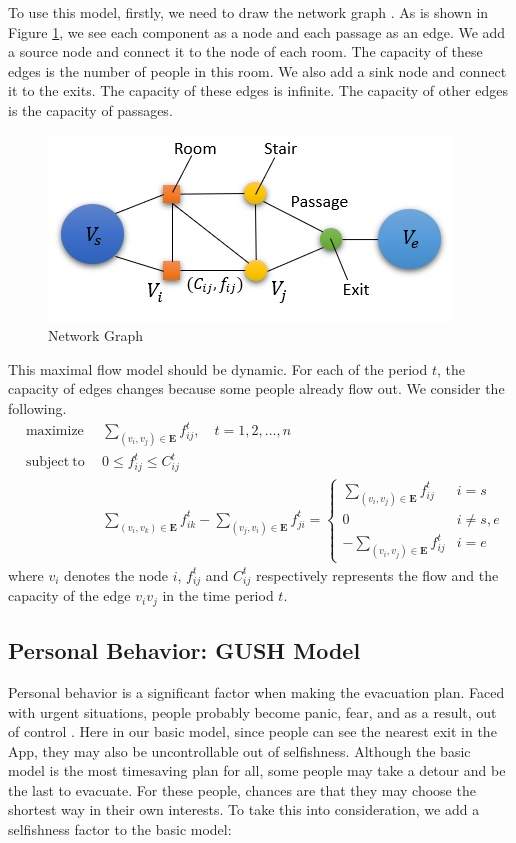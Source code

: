 \documentclass[a4paper,12pt]{article}
\begin{document}
To use this model, firstly, we need to draw the network graph . As is shown in Figure \ref{fig4-1}, we see each component as a node and each passage as an edge. We add a source node and connect it to the node of each room. The capacity of these edges is the number of people in this room. We also add a sink node and connect it to the exits. The capacity of these edges is infinite. The capacity of other edges is the capacity of passages.

\begin{figure} [H]
\centering
\includegraphics{networkflow.jpg}
\caption{Network Graph}
\label{fig4-1}
\end{figure}

This maximal flow model should be dynamic. For each of the period $t$, the capacity of edges changes because some people already flow out. We consider the following.
\begin{eqnarray}
\label{equ1}
 & \textrm{maximize} &               \ \    \sum \limits_{(v_i,v_j)\in \bm{E}} f^t_{ij},\quad t=1, 2, \ldots,n \nonumber \\
 & \textrm{subject}\ \textrm{to} &    \ \   0\leq f^t_{ij}\leq C^t_{ij}\\
 &   &  \ \ 
\sum_{(v_i,v_k) \in  \bm{E}}f^t_{ik} - \sum_{(v_j,v_i)\in  \bm{E}}f^t_{ji}= 
\left\{\begin{matrix}
\sum\limits_{(v_i,v_j) \in  \bm{E}}f^t_{ij} & i=s\\ 
0 & i \neq s,e\\ 
-\sum\limits_{(v_i,v_j) \in  \bm{E}}f^t_{ij} & i=e
\end{matrix}\right. \nonumber
\end{eqnarray}
where $v_i$ denotes the node $i$,  $f^t_{ij}$ and $C^t_{ij}$ respectively represents the flow and the capacity of the edge $v_iv_j$ in the time period $t$.

\subsection{Personal Behavior: GUSH Model}
Personal behavior is a significant factor when making the evacuation plan. Faced with urgent situations, people probably become panic, fear, and as a result, out of control \citep{zhang2005personal}. Here in our basic model, since people can see the nearest exit in the App,  they may also be uncontrollable out of selfishness. Although the basic model is the most timesaving plan for all, some people may take a detour and be the last to evacuate. For these people, chances are that they may choose the shortest way in their own interests. To take this into consideration, we add a selfishness factor to the basic model:
\end{document}
